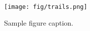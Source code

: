 \begin{figure}
  \texttt{[image: fig/trails.png]}
  \caption{Sample figure caption.}
  \label{fig:trails}
\end{figure}
